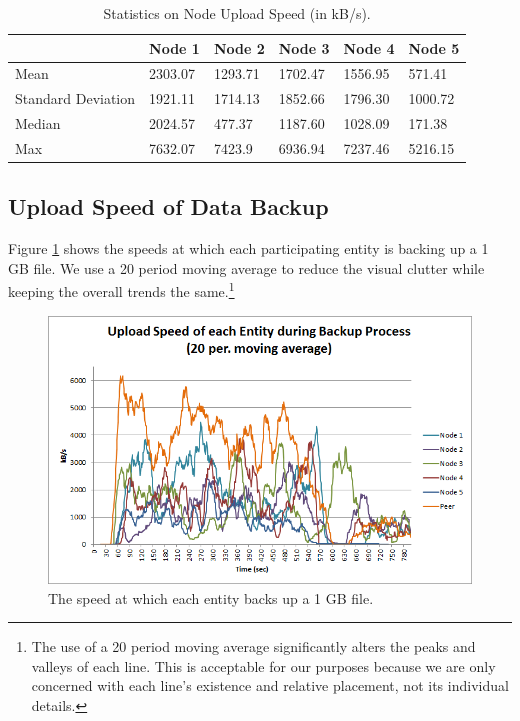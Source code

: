 \documentclass[12pt]{report}
\begin{document}
\begin{table}
\begin{center}
    \begin{tabular}{| l | l | l | l | l | l |}
    \hline
    & Node 1 & Node 2 & Node 3 & Node 4 & Node 5 \\ \hline
    Mean & 2303.07 & 1293.71 & 1702.47 & 1556.95 & 571.41 \\ \hline
    Standard Deviation & 1921.11 & 1714.13 & 1852.66 & 1796.30 & 1000.72 \\ \hline
    Median & 2024.57 & 477.37 & 1187.60 & 1028.09 & 171.38 \\ \hline
    Max & 7632.07 & 7423.9 & 6936.94 & 7237.46 & 5216.15 \\ \hline
    \end{tabular}
    \caption{Statistics on Node Upload Speed (in kB/s).}
    \label{tab:NodeRecoverySpeed}
\end{center}
\end{table}

\subsection{Upload Speed of Data Backup} \label{subsec:UploadSpeedofDataBackup}

Figure \ref{fig:EntityBackupSpeed} shows the speeds at which each participating entity is backing up a 1 GB file.  We use a 20 period moving average to reduce the visual clutter while keeping the overall trends the same.\footnote{The use of a 20 period moving average significantly alters the peaks and valleys of each line. This is acceptable for our purposes because we are only concerned with each line's existence and relative placement, not its individual details.}

\begin{figure}
  \centerline{\includegraphics[scale=1]{figures/EntityBackupSpeed}}
  \caption{The speed at which each entity backs up a 1 GB file. \label{fig:EntityBackupSpeed}}
\end{figure}
\end{document}
